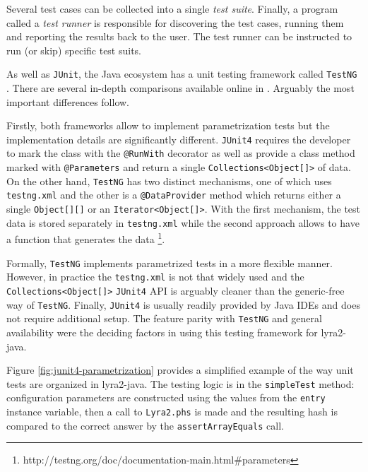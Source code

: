 Several test cases can be collected into a single \emph{test suite}. Finally, a program called a \emph{test runner} is responsible for discovering the test cases, running them and reporting the results back to the user. The test runner can be instructed to run (or skip) specific test suits.

As well as \texttt{JUnit}, the Java ecosystem has a unit testing framework called \texttt{TestNG} \cite{testng:2017:home}. There are several in-depth comparisons available online in \cite{mkyong:2017:testng-vs-junit, wiki:2017:testng-vs-junit}. Arguably the most important differences follow.

Firstly, both frameworks allow to implement parametrization tests but the implementation details are significantly different.  \texttt{JUnit4} requires the developer to mark the class with the \texttt{@RunWith} decorator as well as provide a class method marked with \texttt{@Parameters} and return a single \texttt{Collections<Object[]>} of data. On the other hand, \texttt{TestNG} has two distinct mechanisms, one of which uses \texttt{testng.xml} and the other is a \texttt{@DataProvider} method which returns either a single \texttt{Object[][]} or an \texttt{Iterator<Object[]>}. With the first mechanism, the test data is stored separately in \texttt{testng.xml} while the second approach allows to have a function that generates the data \footnote{http://testng.org/doc/documentation-main.html\#parameters}.

Formally, \texttt{TestNG} implements parametrized tests in a more flexible manner. However, in practice the \texttt{testng.xml} is not that widely used and the \texttt{Collections<Object[]>} \texttt{JUnit4} API is arguably cleaner than the generic-free way of \texttt{TestNG}. Finally, \texttt{JUnit4} is usually readily provided by Java IDEs and does not require additional setup. The feature parity with \texttt{TestNG} and general availability were the deciding factors in using this testing framework for lyra2-java.

Figure \ref{fig:junit4-parametrization} provides a simplified example of the way unit tests are organized in lyra2-java. The testing logic is in the \texttt{simpleTest} method: configuration parameters are constructed using the values from the \texttt{entry} instance variable, then a call to \texttt{Lyra2.phs} is made and the resulting hash is compared to the correct answer by the \texttt{assertArrayEquals} call.

